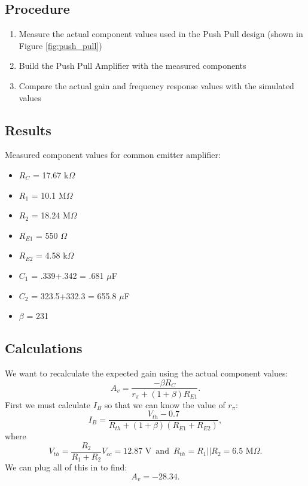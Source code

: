 \documentclass[12pt,letterpaper]{report}
\begin{document}
\subsection*{Procedure}

\begin{enumerate}
\item Measure the actual component values used in the Push Pull design (shown in Figure \ref{fig:push_pull})
\item Build the Push Pull Amplifier with the measured components
\item Compare the actual gain and frequency response values with the simulated values
\end{enumerate}

\subsection*{Results}

Measured component values for common emitter amplifier:
\begin{itemize}
\item $R_C$ = 17.67 k$\Omega$
\item $R_1$ = 10.1 M$\Omega$
\item $R_2$ = 18.24 M$\Omega$
\item $R_{E1}$ = 550 $\Omega$
\item $R_{E2}$ = 4.58 k$\Omega$
\item $C_1$ = .339+.342 = .681 $\mu$F
\item $C_2$ = 323.5+332.3 = 655.8 $\mu$F
\item $\beta$ = 231
\end{itemize}



\subsection*{Calculations}

We want to recalculate the expected gain using the actual component values:
$$
A_v = \frac{-\beta R_C}{r_{\pi}+(1+\beta)R_{E1}}.
$$
First we must calculate $I_B$ so that we can know the value of $r_{\pi}$:
$$
I_B = \frac{V_{th}-0.7}{R_{th}+(1+\beta)(R_{E1}+R_{E2})},
$$
where
$$
V_{th} = \frac{R_2}{R_1+R_2}V_{cc} = 12.87 \text{ V}\, \text{ and } \, 
R_{th} = R_1||R_2 = 6.5 \text{ M}\Omega.
$$
We can plug all of this in to find:
$$
A_v = -28.34.
$$
\end{document}
